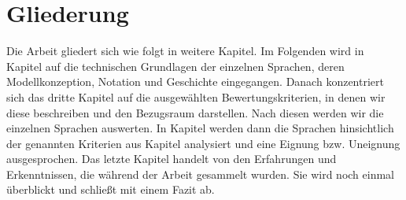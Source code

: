 \section{Gliederung}
\label{sc:Gliederung}
Die Arbeit gliedert sich wie folgt in weitere Kapitel. Im Folgenden wird in Kapitel \pageref{ch:Grundlagen} auf die technischen Grundlagen der einzelnen Sprachen, deren Modellkonzeption, Notation und Geschichte eingegangen. Danach konzentriert sich das dritte Kapitel auf die ausgewählten Bewertungskriterien, in denen wir diese beschreiben und den Bezugsraum darstellen. Nach diesen werden wir die einzelnen Sprachen auswerten. In Kapitel \pageref{ch:Eignung} werden dann die Sprachen hinsichtlich der genannten Kriterien aus Kapitel \pageref{ch:Bewertungskriterien} analysiert und eine Eignung bzw. Uneignung ausgesprochen.
Das letzte Kapitel \pageref{ch:Fazit} handelt von den Erfahrungen und Erkenntnissen, die während
der Arbeit gesammelt wurden. Sie wird noch einmal überblickt und schließt mit einem Fazit ab.
